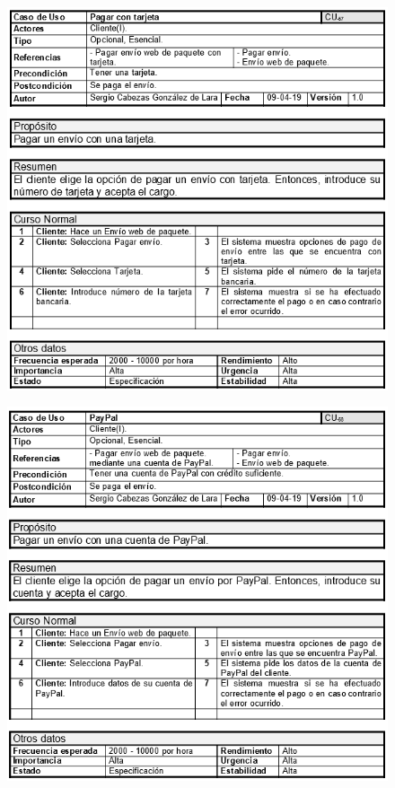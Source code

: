 \begin{figure}[H]
	\centering
	\includegraphics[width=16cm]{57}
\end{figure}
\begin{figure}[H]
	\centering
	\includegraphics[width=16cm]{58}
\end{figure}
